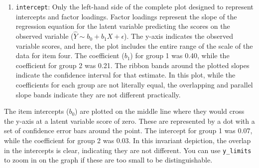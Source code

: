 \documentclass[
  man]{apa7}
\providecommand{\tightlist}{%
  \setlength{\itemsep}{0pt}\setlength{\parskip}{0pt}}
\begin{document}
\begin{enumerate}
\def\labelenumi{\arabic{enumi})}
\setcounter{enumi}{1}
\tightlist
\item
  \texttt{intercept}: Only the left-hand side of the complete plot designed to represent intercepts and factor loadings. Factor loadings represent the slope of the regression equation for the latent variable predicting the scores on the observed variable (\(\hat{Y} \sim b_0 + b_1X + \epsilon\)). The y-axis indicates the observed variable scores, and here, the plot includes the entire range of the scale of the data for item four. The coefficient (\(b_1\)) for group 1 was 0.40, while the coefficient for group 2 was 0.21. The ribbon bands around the plotted slopes indicate the confidence interval for that estimate. In this plot, while the coefficients for each group are not literally equal, the overlapping and parallel slope bands indicate they are not different practically.
\end{enumerate}

The item intercepts (\(b_0\)) are plotted on the middle line where they would cross the y-axis at a latent variable score of zero. These are represented by a dot with a set of confidence error bars around the point. The intercept for group 1 was 0.07, while the coefficient for group 2 was 0.03. In this invariant depiction, the overlap in the intercepts is clear, indicating they are not different. You can use \texttt{y\_limits} to zoom in on the graph if these are too small to be distinguishable.
\end{document}
